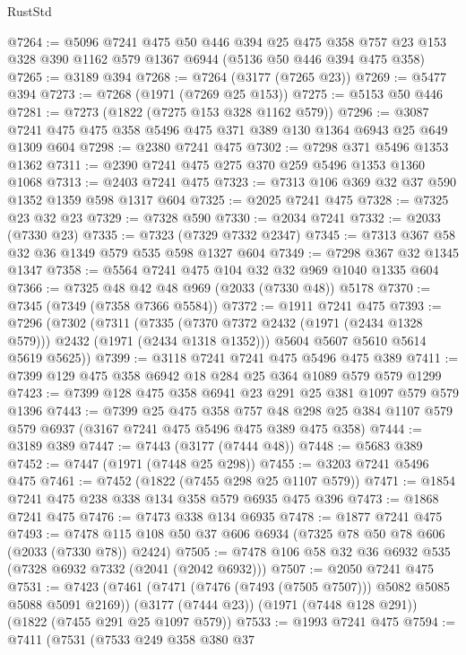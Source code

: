 \begin{lexlean}{RustStd}
\begin{coremodule}
{\begin{coremodule}
{{{{{{{{{{{{{@7264 := @5096
    @7241
    @475
    @50
    @446
    @394
    @25
    @475
    @358
    @757
    @23
    @153
    @328
    @390
    @1162
    @579
    @1367
    @6944
    (@5136 @50 @446 @394 @475 @358)
@7265 := @3189 @394
@7268 := @7264 (@3177 (@7265 @23))
@7269 := @5477 @394
@7273 := @7268 (@1971 (@7269 @25 @153))
@7275 := @5153 @50 @446
@7281 := @7273 (@1822 (@7275 @153 @328 @1162 @579))
@7296 := @3087 @7241 @475 @475 @358 @5496 @475 @371 @389 @130 @1364 @6943 @25 @649 @1309 @604
@7298 := @2380 @7241 @475
@7302 := @7298 @371 @5496 @1353 @1362
@7311 := @2390 @7241 @475 @275 @370 @259 @5496 @1353 @1360 @1068
@7313 := @2403 @7241 @475
@7323 := @7313 @106 @369 @32 @37 @590 @1352 @1359 @598 @1317 @604
@7325 := @2025 @7241 @475
@7328 := @7325 @23 @32 @23
@7329 := @7328 @590
@7330 := @2034 @7241
@7332 := @2033 (@7330 @23)
@7335 := @7323 (@7329 @7332 @2347)
@7345 := @7313 @367 @58 @32 @36 @1349 @579 @535 @598 @1327 @604
@7349 := @7298 @367 @32 @1345 @1347
@7358 := @5564 @7241 @475 @104 @32 @32 @969 @1040 @1335 @604
@7366 := @7325 @48 @42 @48 @969 (@2033 (@7330 @48)) @5178
@7370 := @7345 (@7349 (@7358 @7366 @5584))
@7372 := @1911 @7241 @475
@7393 := @7296
    (@7302
      (@7311
        (@7335 (@7370 @7372 @2432 (@1971 (@2434 @1328 @579))) @2432 (@1971 (@2434 @1318 @1352)))
        @5604
        @5607
        @5610
        @5614
        @5619
        @5625))
@7399 := @3118 @7241 @7241 @475 @5496 @475 @389
@7411 := @7399 @129 @475 @358 @6942 @18 @284 @25 @364 @1089 @579 @579 @1299
@7423 := @7399 @128 @475 @358 @6941 @23 @291 @25 @381 @1097 @579 @579 @1396
@7443 := @7399
    @25
    @475
    @358
    @757
    @48
    @298
    @25
    @384
    @1107
    @579
    @579
    @6937
    (@3167 @7241 @475 @5496 @475 @389 @475 @358)
@7444 := @3189 @389
@7447 := @7443 (@3177 (@7444 @48))
@7448 := @5683 @389
@7452 := @7447 (@1971 (@7448 @25 @298))
@7455 := @3203 @7241 @5496 @475
@7461 := @7452 (@1822 (@7455 @298 @25 @1107 @579))
@7471 := @1854 @7241 @475 @238 @338 @134 @358 @579 @6935 @475 @396
@7473 := @1868 @7241 @475
@7476 := @7473 @338 @134 @6935
@7478 := @1877 @7241 @475
@7493 := @7478 @115 @108 @50 @37 @606 @6934 (@7325 @78 @50 @78 @606 (@2033 (@7330 @78)) @2424)
@7505 := @7478 @106 @58 @32 @36 @6932 @535 (@7328 @6932 @7332 (@2041 (@2042 @6932)))
@7507 := @2050 @7241 @475
@7531 := @7423
    (@7461 (@7471 (@7476 (@7493 (@7505 @7507))) @5082 @5085 @5088 @5091 @2169))
    (@3177 (@7444 @23))
    (@1971 (@7448 @128 @291))
    (@1822 (@7455 @291 @25 @1097 @579))
@7533 := @1993 @7241 @475
@7594 := @7411
    (@7531
      (@7533
        @249
        @358
        @380
        @37
}}}}}}}}}}}}}
\end{coremodule}}
\end{coremodule}
\end{lexlean}
